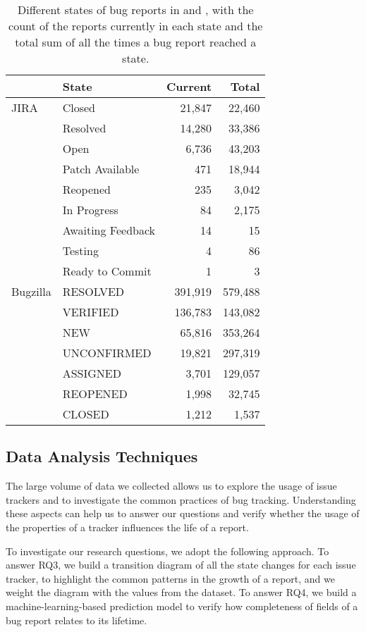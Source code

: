 \begin{table}[ht]\small
\centering
\caption{Different states of bug reports in \bzilla and \jira, with the count of the reports currently in each state and the total sum of all the times a bug report reached a state.}
\begin{tabular}{l|l|rr}
\rowcolor{tableheader}{\bfseries Tracker} & {\bfseries State} & {\bfseries Current} & {\bfseries Total} \\ \hline
JIRA & Closed & 21,847 & 22,460 \\
& Resolved & 14,280 & 33,386  \\
&  Open & 6,736 & 43,203 \\
&  Patch Available & 471 & 18,944 \\
&  Reopened & 235 & 3,042 \\
&  In Progress & 84 & 2,175 \\
&  Awaiting Feedback & 14 & 15 \\
&  Testing & 4 & 86 \\
&  Ready to Commit & 1 & 3 \\ \hline
Bugzilla & RESOLVED & 391,919 & 579,488 \\
&  VERIFIED & 136,783 & 143,082\\
&  NEW & 65,816 & 353,264\\
&  UNCONFIRMED & 19,821 & 297,319 \\
&  ASSIGNED & 3,701 & 129,057 \\
&  REOPENED & 1,998 & 32,745 \\
&  CLOSED & 1,212 & 1,537 \\ \hline
\end{tabular}
\label{tab:dataset-statuses}
\end{table}

\subsection{Data Analysis Techniques}

The large volume of data we collected allows us to explore the usage of issue trackers and to investigate the common practices of bug tracking.
Understanding these aspects can help us to answer our questions and verify whether the usage of the properties of a tracker influences the life of a  report.

To investigate our research questions, we adopt the following approach.
To answer RQ3, we build a transition diagram of all the state changes for each issue tracker, to highlight the common patterns in the growth of a report, and we weight the diagram with the values from the dataset.
To answer RQ4, we build a machine-learning-based prediction model to verify how completeness of fields of a bug report relates to its lifetime.


